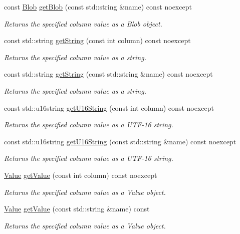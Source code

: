\begin{DoxyCompactItemize}
const \hyperlink{a00002}{Blob} \hyperlink{a00010_a4e50d9ec365c547b5edb7d062aeba72b}{get\-Blob} (const std\-::string \&name) const noexcept
\begin{DoxyCompactList}\small\item\em Returns the specified column value as a Blob object. \end{DoxyCompactList}\item 
const std\-::string \hyperlink{a00010_a0920d021f6962f75e7b555e3f20fc0fc}{get\-String} (const int column) const noexcept
\begin{DoxyCompactList}\small\item\em Returns the specified column value as a string. \end{DoxyCompactList}\item 
const std\-::string \hyperlink{a00010_a44f9f5da46aa91b869fe26a188e803fa}{get\-String} (const std\-::string \&name) const noexcept
\begin{DoxyCompactList}\small\item\em Returns the specified column value as a string. \end{DoxyCompactList}\item 
const std\-::u16string \hyperlink{a00010_a2b48f9e2ffbcfe787d85b4372a7ee29d}{get\-U16\-String} (const int column) const noexcept
\begin{DoxyCompactList}\small\item\em Returns the specified column value as a U\-T\-F-\/16 string. \end{DoxyCompactList}\item 
const std\-::u16string \hyperlink{a00010_ad6024ad6e74ee1ac47ad0ce79f905026}{get\-U16\-String} (const std\-::string \&name) const noexcept
\begin{DoxyCompactList}\small\item\em Returns the specified column value as a U\-T\-F-\/16 string. \end{DoxyCompactList}\item 
\hyperlink{a00015}{Value} \hyperlink{a00010_a41fcbc5da6eb3fe6fc75e4faed208fc6}{get\-Value} (const int column) const noexcept
\begin{DoxyCompactList}\small\item\em Returns the specified column value as a Value object. \end{DoxyCompactList}\item 
\hyperlink{a00015}{Value} \hyperlink{a00010_ad352a7124ee46d756462c8a1b014599a}{get\-Value} (const std\-::string \&name) const
\begin{DoxyCompactList}\small\item\em Returns the specified column value as a Value object. \end{DoxyCompactList}\item 

\end{DoxyCompactItemize}
